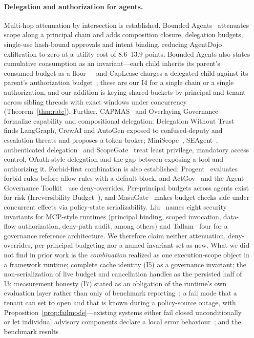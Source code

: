 \paragraph{Delegation and authorization for agents.} Multi-hop attenuation by intersection is established. Bounded Agents~\cite{muruaga2026boundedagents} attenuates scope along a principal chain and adds composition closure, delegation budgets, single-use hash-bound approvals and intent binding, reducing AgentDojo exfiltration to zero at a utility cost of 8.6--13.9 points. Bounded Agents also states cumulative consumption as an invariant---each child inherits its parent's consumed budget as a floor~\cite{muruaga2026boundedagents}---and CapLease charges a delegated child against its parent's authorization budget~\cite{xu2026caplease}; these are our I4 for a single chain or a single authorization, and our addition is keying shared buckets by principal and tenant across sibling threads with exact windows under concurrency (Theorem~\ref{thm:rate}). Further, CAPMAS~\cite{veski2026capmas} and Overlaying Governance~\cite{ibrahim2026overlaying} formalize capability and compositional delegation; Delegation Without Trust~\cite{dantuluri2026delegation} finds LangGraph, CrewAI and AutoGen exposed to confused-deputy and escalation threats and proposes a token broker; MiniScope~\cite{zhu2025miniscope}, SEAgent~\cite{ji2026seagent}, authenticated delegation~\cite{south2025authenticated} and ScopeGate~\cite{zuvic2026scopegate} treat least privilege, mandatory access control, OAuth-style delegation and the gap between exposing a tool and authorizing it. Forbid-first combination is also established: Progent~\cite{shi2025progent} evaluates forbid rules before allow rules with a default block, and ActGov~\cite{zhang2026actgov} and the Agent Governance Toolkit~\cite{msagentgovernance} use deny-overrides. Per-principal budgets across agents exist for risk (Irreversibility Budget~\cite{mohammadi2026irreversibility}), and MasuGate~\cite{peng2026statefulgov} makes budget checks safe under concurrent effects via policy-state serializability. Liu~\cite{liu2026mcpinvariants} names eight security invariants for MCP-style runtimes (principal binding, scoped invocation, data-flow authorization, deny-path audit, among others) and Tallam~\cite{tallam2026fiveplane} four for a governance reference architecture. We therefore claim neither attenuation, deny-overrides, per-principal budgeting nor a named invariant set as new. What we did not find in prior work is the \emph{combination} realized as one execution-scope object in a framework runtime; complete cache identity (I5) as a governance invariant; the non-serialization of live budget and cancellation handles as the persisted half of I3; measurement honesty (I7) stated as an obligation of the runtime's own evaluation layer rather than only of benchmark reporting~\cite{solozobov2026demmbench,zhu2025abc}; a fail mode that a tenant can set to open and that is known during a policy-source outage, with Proposition~\ref{prop:failmode}---existing systems either fail closed unconditionally~\cite{msagentgovernance,muruaga2026boundedagents} or let individual advisory components declare a local error behaviour~\cite{msagentgovernance}; and the benchmark results 